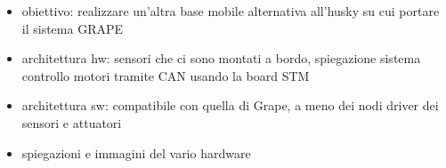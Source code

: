 \begin{itemize}
	\item obiettivo: realizzare un'altra base mobile alternativa all'husky su cui portare il sistema GRAPE
	\item architettura hw: sensori che ci sono montati a bordo, spiegazione sistema controllo motori tramite CAN usando la board STM
	\item architettura sw: compatibile con quella di Grape, a meno dei nodi driver dei sensori e attuatori
	\item spiegazioni e immagini del vario hardware
\end{itemize}

